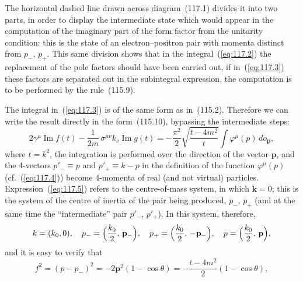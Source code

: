 The horizontal dashed line drawn across diagram~(117.1) divides it into two parts, in order to display the intermediate state which would appear in the computation of the imaginary part of the form factor from the unitarity condition: this is the state of an electron--positron pair with momenta distinct from $p_-$, $p_+$. This same division shows that in the integral~(\ref{eq:117.2}) the replacement of the pole factors should have been carried out, if in~(\ref{eq:117.3}) these factors are separated out in the subintegral expression, the computation is to be performed by the rule~(115.9).

The integral in~(\ref{eq:117.3}) is of the same form as in~(115.2). Therefore we can write the result directly in the form~(115.10), bypassing the intermediate steps:
\begin{equation}
2\gamma^\mu \operatorname{Im} f(t) - \frac{1}{2m}\,\sigma^{\mu\nu} k_\nu\operatorname{Im} g(t) = -\frac{\pi^2}{2}\sqrt{\frac{t - 4m^2}{t}}\int \varphi^\mu(p)\,d o_{\mathbf{p}},
\label{eq:117.5}
\end{equation}
where $t = k^2$, the integration is performed over the direction of the vector $\mathbf{p}$, and the 4-vectors $p'_- \equiv p$ and $p'_+ \equiv k - p$ in the definition of the function $\varphi^\mu(p)$ (cf.~(\ref{eq:117.4})) become 4-momenta of real (and not virtual) particles. Expression~(\ref{eq:117.5}) refers to the centre-of-mass system, in which $\mathbf{k} = 0$; this is the system of the centre of inertia of the pair being produced, $p_-$, $p_+$ (and at the same time the ``intermediate'' pair $p'_-$, $p'_+$). In this system, therefore,
\[
k = (k_0, 0), \quad p_- = \Bigl(\frac{k_0}{2},\, \mathbf{p}_-\Bigr), \quad p_+ = \Bigl(\frac{k_0}{2},\, -\mathbf{p}_-\Bigr), \quad p = \Bigl(\frac{k_0}{2},\, \mathbf{p}\Bigr),
\]
and it is easy to verify that
\begin{equation}
f^2 = (p - p_-)^2 = -2\mathbf{p}^2(1 - \cos\theta) = -\frac{t - 4m^2}{2}(1 - \cos\theta),
\label{eq:117.6}
\end{equation}


